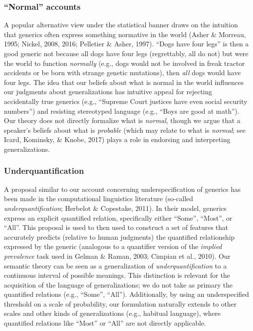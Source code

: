 \documentclass[english,,man,floatsintext]{apa6}
\theoremstyle{definition}
\theoremstyle{definition}
\theoremstyle{definition}
\theoremstyle{remark}
\begin{document}
\hypertarget{normal-accounts}{%
\subsubsection{\texorpdfstring{\enquote{Normal}
accounts}{``Normal'' accounts}}\label{normal-accounts}}

A popular alternative view under the statistical banner draws on the
intuition that generics often express something normative in the world
(Asher \& Morreau, 1995; Nickel, 2008, 2016; Pelletier \& Asher, 1997).
\enquote{Dogs have four legs} is then a good generic not because all
dogs have four legs (regrettably, all do not) but were the world to
function \emph{normally} (e.g., dogs would not be involved in freak
tractor accidents or be born with strange genetic mutations), then
\emph{all} dogs would have four legs. The idea that our beliefs about
what is normal in the world influences our judgments about
generalizations has intuitive appeal for rejecting accidentally true
generics (e.g., \enquote{Supreme Court justices have even social
security numbers}) and resisting stereotyped language (e.g.,
\enquote{Boys are good at math}). Our theory does not directly formalize
what is \emph{normal}, though we argue that a speaker's beliefs about
what is \emph{probable} (which may relate to what is \emph{normal}; see
Icard, Kominsky, \& Knobe, 2017) plays a role in endorsing and
interpreting generalizations.

\hypertarget{underquantification}{%
\subsubsection{Underquantification}\label{underquantification}}

A proposal similar to our account concerning underspecification of
generics has been made in the computational linguistics literature
(so-called \emph{underquantification}; Herbelot \& Copestake, 2011). In
their model, generics express an explicit quantified relation,
specifically either \enquote{Some}, \enquote{Most}, or \enquote{All}.
This proposal is used to then used to construct a set of features that
accurately predicts (relative to human judgments) the quantified
relationship expressed by the generic (analogous to a quantifier version
of the \emph{implied prevalence} task used in Gelman \& Raman, 2003;
Cimpian et al., 2010). Our semantic theory can be seen as a
generalization of \emph{underquantification} to a continuous interval of
possible meanings. This distinction is relevant for the acquisition of
the language of generalizations; we do not take as primary the
quantified relations (e.g., \enquote{Some}, \enquote{All}).
Additionally, by using an underspecified threshold on a scale of
probability, our formulation naturally extends to other scales and other
kinds of generalizations (e.g., habitual language), where quantified
relations like \enquote{Most} or \enquote{All} are not directly
applicable.
\end{document}
